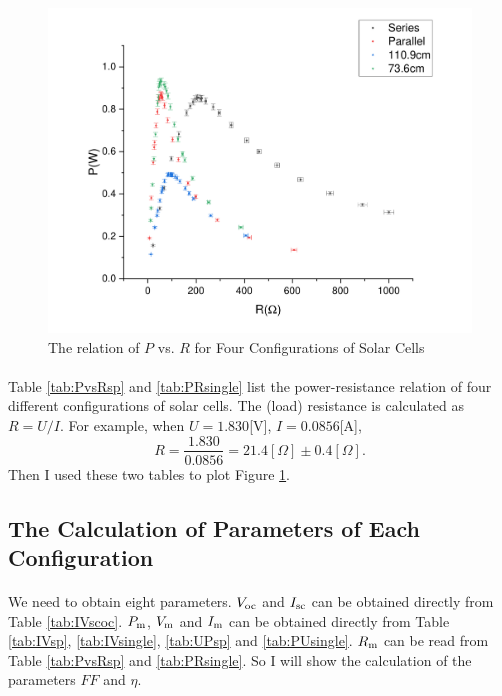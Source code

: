 \documentclass[a4paper]{article}
\begin{document}
    \begin{figure}[!ht]
        \centering
        \includegraphics[width=\textwidth]{fig/PvsR.pdf}
        \caption{The relation of $P$ vs. $R$ for Four Configurations of Solar Cells}
        \label{fig:PvsR}
    \end{figure}
    \paragraph{} Table \ref{tab:PvsRsp} and \ref{tab:PRsingle} list the power-resistance relation of four different configurations of solar cells. The (load) resistance is calculated as $R=U/I$. For example, when $U=1.830$[V], $I=0.0856$[A], $$R=\frac{1.830}{0.0856}=21.4[\Omega]\pm 0.4[\Omega].$$
    Then I used these two tables to plot Figure \ref{fig:PvsR}.
    \subsection{The Calculation of Parameters of Each Configuration}
    \paragraph{} We need to obtain eight parameters. $V_{\rm oc}$ and $I_{\rm sc}$ can be obtained directly from Table \ref{tab:IVscoc}. $P_{\rm m}$, $V_{\rm m}$ and $I_{\rm m}$ can be obtained directly from Table \ref{tab:IVsp}, \ref{tab:IVsingle}, \ref{tab:UPsp} and \ref{tab:PUsingle}. $R_{\rm m}$ can be read from Table \ref{tab:PvsRsp} and \ref{tab:PRsingle}. So I will show the calculation of the parameters $FF$ and $\eta$. 
    \vspace{-5mm}
\end{document}
